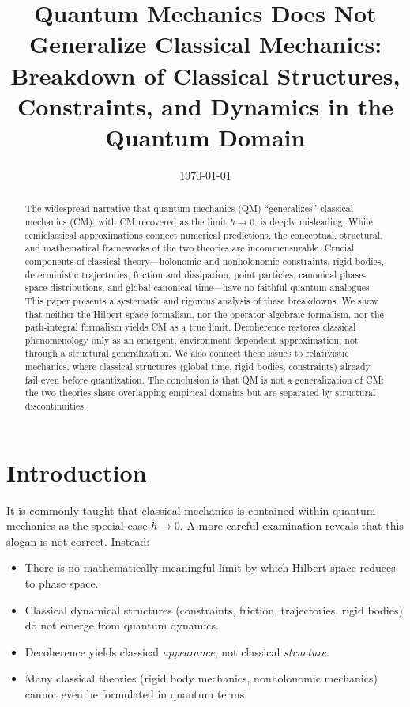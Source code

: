 \documentclass[12pt]{article}
\title{Quantum Mechanics Does Not Generalize Classical Mechanics:\\
Breakdown of Classical Structures, Constraints, and Dynamics in the Quantum Domain}
\author{}
\date{\today}
\begin{document}
\maketitle

\begin{abstract}
The widespread narrative that quantum mechanics (QM) ``generalizes'' classical mechanics (CM), with CM recovered as the limit $\hbar\to 0$, is deeply misleading. While semiclassical approximations connect numerical predictions, the conceptual, structural, and mathematical frameworks of the two theories are incommensurable. Crucial components of classical theory---holonomic and nonholonomic constraints, rigid bodies, deterministic trajectories, friction and dissipation, point particles, canonical phase-space distributions, and global canonical time---have no faithful quantum analogues. This paper presents a systematic and rigorous analysis of these breakdowns. We show that neither the Hilbert-space formalism, nor the operator-algebraic formalism, nor the path-integral formalism yields CM as a true limit. Decoherence restores classical phenomenology only as an emergent, environment-dependent approximation, not through a structural generalization. We also connect these issues to relativistic mechanics, where classical structures (global time, rigid bodies, constraints) already fail even before quantization. The conclusion is that QM is not a generalization of CM: the two theories share overlapping empirical domains but are separated by structural discontinuities.
\end{abstract}

\tableofcontents

\section{Introduction}

It is commonly taught that classical mechanics is contained within quantum mechanics as the special case $\hbar \to 0$. A more careful examination reveals that this slogan is not correct. Instead:

\begin{itemize}
    \item There is no mathematically meaningful limit by which Hilbert space reduces to phase space.
    \item Classical dynamical structures (constraints, friction, trajectories, rigid bodies) do not emerge from quantum dynamics.
    \item Decoherence yields classical \emph{appearance}, not classical \emph{structure}.
    \item Many classical theories (rigid body mechanics, nonholonomic mechanics) cannot even be formulated in quantum terms.
\end{itemize}
\end{document}
